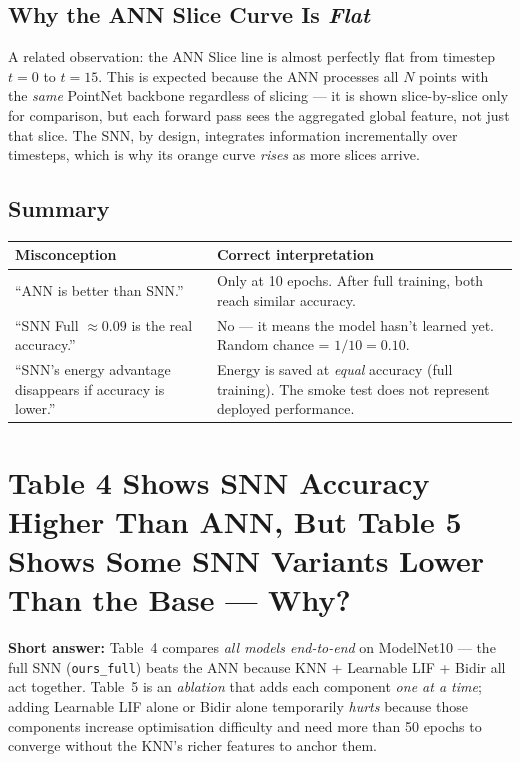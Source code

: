 \documentclass[11pt,a4paper]{article}
\begin{document}
\subsection{Why the ANN Slice Curve Is \emph{Flat}}

A related observation: the ANN Slice line is almost perfectly flat from
timestep $t = 0$ to $t = 15$.  This is expected because the ANN processes
all $N$ points with the \emph{same} PointNet backbone regardless of
slicing --- it is shown slice-by-slice only for comparison, but each forward
pass sees the aggregated global feature, not just that slice.  The SNN, by
design, integrates information incrementally over timesteps, which is why its
orange curve \emph{rises} as more slices arrive.

\subsection{Summary}

\begin{center}
\begin{tabular}{p{5cm}p{8cm}}
\toprule
Misconception & Correct interpretation \\
\midrule
``ANN is better than SNN.'' &
  Only at 10 epochs. After full training, both reach similar accuracy. \\
``SNN Full $\approx 0.09$ is the real accuracy.'' &
  No --- it means the model hasn't learned yet. Random chance = $1/10 = 0.10$. \\
``SNN's energy advantage disappears if accuracy is lower.'' &
  Energy is saved at \emph{equal} accuracy (full training). The smoke test
  does not represent deployed performance. \\
\bottomrule
\end{tabular}
\end{center}

\section{Table 4 Shows SNN Accuracy Higher Than ANN, But Table 5 Shows Some
         SNN Variants Lower Than the Base --- Why?}

\begin{answerbox}
\textbf{Short answer:}
Table~4 compares \emph{all models end-to-end} on ModelNet10 --- the full SNN
(\texttt{ours\_full}) beats the ANN because KNN + Learnable LIF + Bidir all
act together. Table~5 is an \emph{ablation} that adds each component
\emph{one at a time}; adding Learnable LIF alone or Bidir alone temporarily
\emph{hurts} because those components increase optimisation difficulty and need
more than 50 epochs to converge without the KNN's richer features to anchor them.
\end{answerbox}
\end{document}
